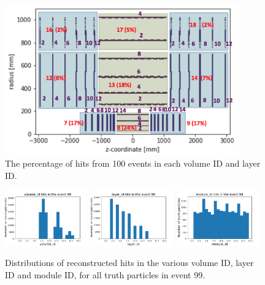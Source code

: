 \begin{figure}[!hbt]
\centering
\includegraphics[width=0.9\textwidth]{./plots/DetectorVolumeIDLayerID.png}
\caption{The percentage of hits from 100 events in each volume ID and layer ID.}
\label{fig:DetectorVolumeIDLayerID}
\end{figure}

\begin{figure}[!htb]
\centering
\includegraphics[width=0.32\textwidth]{plots/DataExploration_volume_id.pdf}
\includegraphics[width=0.32\textwidth]{plots/DataExploration_layer_id.pdf}
\includegraphics[width=0.32\textwidth]{plots/DataExploration_module_id.pdf}
\caption{Distributions of reconstructed hits in the various volume ID, layer ID and module ID, for all truth particles in event 99.}
\label{fig:DetectorHits}
\end{figure}

